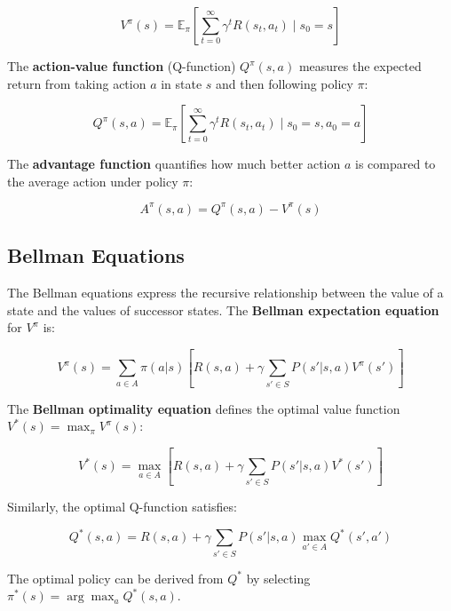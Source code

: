 \documentclass[12pt,a4paper]{report}
\begin{document}
\begin{equation}
V^\pi(s) = \mathbb{E}_{\pi} \left[ \sum_{t=0}^{\infty} \gamma^t R(s_t, a_t) \mid s_0 = s \right]
\end{equation}

The \textbf{action-value function} (Q-function) $Q^\pi(s,a)$ measures the expected return from taking action $a$ in state $s$ and then following policy $\pi$:

\begin{equation}
Q^\pi(s,a) = \mathbb{E}_{\pi} \left[ \sum_{t=0}^{\infty} \gamma^t R(s_t, a_t) \mid s_0 = s, a_0 = a \right]
\end{equation}

The \textbf{advantage function} quantifies how much better action $a$ is compared to the average action under policy $\pi$:

\begin{equation}
A^\pi(s,a) = Q^\pi(s,a) - V^\pi(s)
\end{equation}

\subsection{Bellman Equations}

The Bellman equations express the recursive relationship between the value of a state and the values of successor states. The \textbf{Bellman expectation equation} for $V^\pi$ is:

\begin{equation}
V^\pi(s) = \sum_{a \in A} \pi(a|s) \left[ R(s,a) + \gamma \sum_{s' \in S} P(s'|s,a) V^\pi(s') \right]
\end{equation}

The \textbf{Bellman optimality equation} defines the optimal value function $V^*(s) = \max_\pi V^\pi(s)$:

\begin{equation}
V^*(s) = \max_{a \in A} \left[ R(s,a) + \gamma \sum_{s' \in S} P(s'|s,a) V^*(s') \right]
\end{equation}

Similarly, the optimal Q-function satisfies:

\begin{equation}
Q^*(s,a) = R(s,a) + \gamma \sum_{s' \in S} P(s'|s,a) \max_{a' \in A} Q^*(s',a')
\end{equation}

The optimal policy can be derived from $Q^*$ by selecting $\pi^*(s) = \arg\max_a Q^*(s,a)$.
\end{document}

